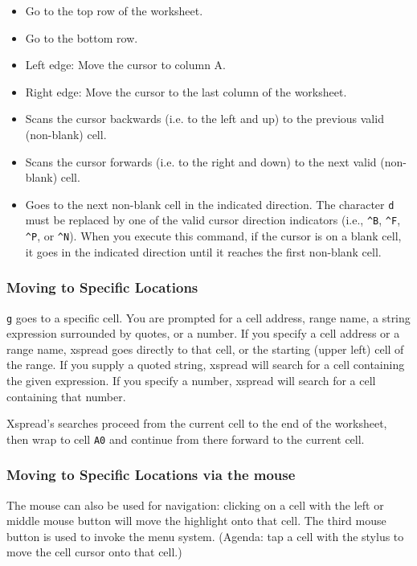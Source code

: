 \documentclass[titlepage]{article}
\newcommand{\titem}[1]{\item[{\tt #1}]}
\newcommand{\ctrl}[1]{\texttt{\^{}#1}}
\begin{document}
\begin{itemize}
  
  \titem{\^{}} Go to the top row of the worksheet.
  
  \titem{\#} Go to the bottom row.
  
  \titem{0} Left edge: Move the cursor to column A.
  
  \titem{\$} Right edge: Move the cursor to the last column of the
  worksheet.
  
  \titem{b} Scans the cursor backwards (i.e. to the left and up) to
    the previous valid (non-blank) cell.
  
  \titem{w} Scans the cursor forwards (i.e. to the right and down) to
    the next valid (non-blank) cell.
  
  \titem{\ctrl{E}d} Goes to the next non-blank cell in the indicated
    direction.  The character \texttt{d} must be replaced by one of
    the valid cursor direction indicators (i.e., \ctrl{B}, \ctrl{F},
    \ctrl{P}, or \ctrl{N}).  When you execute this command, if the
    cursor is on a blank cell, it goes in the indicated direction
    until it reaches the first non-blank cell.

\end{itemize}

\subsubsection{Moving to Specific Locations}

\texttt{g} goes to a specific cell.  You are prompted for a cell
address, range name, a string expression surrounded by quotes, or a
number.  If you specify a cell address or a range name,
\textsf{xspread} goes directly to that cell, or the starting (upper
left) cell of the range.  If you supply a quoted string,
\textsf{xspread} will search for a cell containing the given
expression.  If you specify a number, \textsf{xspread} will search for
a cell containing that number.

\textsf{Xspread}'s searches proceed from the current cell to the end
of the worksheet, then wrap to cell \texttt{A0} and continue from
there forward to the current cell.

\subsubsection{Moving to Specific Locations via the mouse}

The mouse can also be used for navigation: clicking on a cell with the
left or middle mouse button will move the highlight onto that cell.
The third mouse button is used to invoke the menu system.  (Agenda: tap a
cell with the stylus to move the cell cursor onto that cell.)
\end{document}
